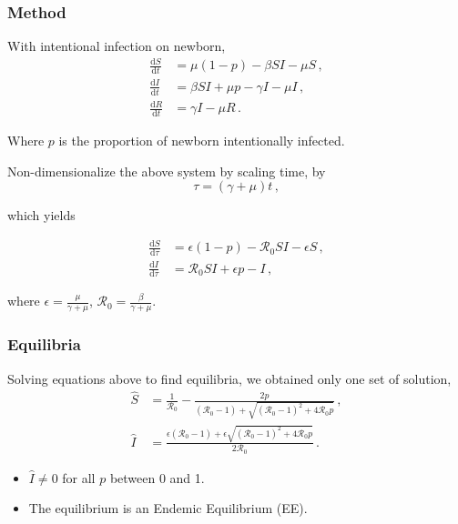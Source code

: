 \documentclass[12pt]{beamer}
\newcommand\dbyd[2]{\frac{\mathrm d{#1}}{\mathrm d{#2}}}
\newcommand{\R}{\mathcal{R}}
\begin{document}
\begin{frame}
\frametitle{Method}
With intentional infection on newborn, 
\begin{equation}\label{2}
\begin{split}
\dbyd{S}{t}&=\mu(1-p)- \beta SI-\mu S \,,\\
\dbyd{I}{t}&=\beta SI+\mu p-\gamma I -\mu I\,,\\
\dbyd{R}{t}&=\gamma I-\mu R\,.
\end{split}
\end{equation}

Where $p$ is the proportion of newborn intentionally infected.
\end{frame}
\begin{frame}
Non-dimensionalize the above system by scaling time, by
\begin{equation}
\tau=(\gamma+\mu)t \,,
\end{equation}

which yields

\begin{subequations}\label{3}
\begin{align}
\dbyd{S}{\tau}&=\epsilon(1-p)- \R_0  SI-\epsilon S \,,\\
\dbyd{I}{\tau}&=\R_0 SI+\epsilon p-I \,,
\end{align}
\end{subequations}

where $\epsilon=\frac{\mu}{\gamma+\mu}$, $\R_0=\frac{\beta}{\gamma+\mu}$.
\end{frame}
\begin{frame}
\frametitle{Equilibria}
Solving equations above to find equilibria, we obtained only one set of solution,
\begin{subequations}
\begin{align}
\hat{S} &=\frac{1}{\R_0}-\frac{2p}{(\R_0 -1)+ \sqrt{(\R_0-1)^2+4\R_0 p}}\,, \label{Shat1}\\
\hat{I} &= \frac{\epsilon(\R_0 -1)+ \epsilon \sqrt{(\R_0-1)^2+4\R_0
    p}}{2\R_0}\,.\label{Ihat1}
\end{align}
\end{subequations}
\begin{itemize}
\item $\hat{I}\neq 0$ for all $p$ between 0 and 1. \item The equilibrium is an Endemic Equilibrium (EE).
\end{itemize}
\end{frame}
\end{document}
